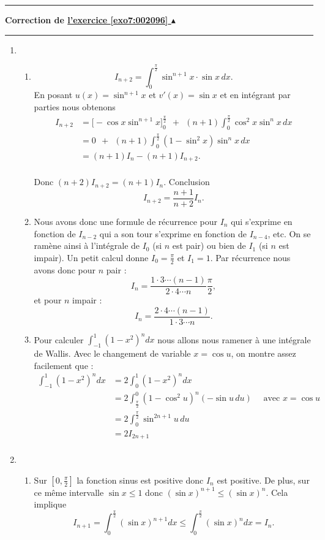 \documentclass[11pt,a4paper]{article}
\renewcommand{\le}{\leqslant} \renewcommand{\leq}{\leqslant}
\newcounter{exo}
\newcommand{\correction}[1]{\hypertarget{cor7:#1}{}\label{cor7:#1}{\bf Correction de \hyperlink{exo7:#1}{l'exercice \ref{exo7:#1} $\blacktriangle$}}\vspace{1mm}\hrule\vspace{1mm}}
\newcommand{\fincorrection}{\vspace{1mm}\hrule\vspace*{7mm}}
\begin{document}
\fincorrection
\correction{002096}
  \begin{enumerate}

  \item 
  \begin{enumerate}
     \item $$ I_{n+2}  = \int_0^{\frac \pi 2} \sin^{n+1} x \cdot \sin x \,  dx.$$
En posant $u(x) = \sin^{n+1} x$ et $v'(x) = \sin x$ et en intégrant par parties nous obtenons
\begin{align*}
I_{n+2} &= \bigg[ -\cos x \sin^{n+1}x \bigg]_0^{\frac \pi 2} \ \  + \ \ (n+1)\int_0^{\frac \pi 2} \cos^2x \sin^nx \, dx \\
 &= 0 \ \  + \ \ (n+1)\int_0^{\frac \pi 2} (1-\sin^2x)\sin^nx \, dx \\
 &= (n+1)I_n-(n+1)I_{n+2}.  \\
\end{align*}

Donc $(n+2)I_{n+2}=(n+1)I_n$.
Conclusion 
$$I_{n+2} = \frac{n+1}{n+2} I_n.$$

     \item Nous avons donc une formule de récurrence pour $I_n$ qui s'exprime en fonction de $I_{n-2}$
qui a son tour s'exprime en fonction de $I_{n-4}$, etc. On se ramène ainsi à l'intégrale de $I_0$ (si $n$ est pair) 
ou bien de $I_1$ (si $n$ est impair). Un petit calcul donne $I_0=\frac \pi 2$ et $I_1=1$.
Par récurrence nous avons donc pour $n$ pair :
$$I_n = \frac{1\cdot3 \cdots (n-1) }{2 \cdot 4 \cdots n} \frac \pi 2,$$
et pour $n$ impair :
$$I_n = \frac{2 \cdot 4 \cdots (n-1)}{1 \cdot 3 \cdots n}.$$

     \item Pour calculer $\int_{-1}^1\left( 1-x^2\right) ^n d x$ nous allons nous ramener à une intégrale de Wallis.
Avec le changement de variable $x=\cos u$, on montre assez facilement que :
\begin{align*}
 \int_{-1}^1\left( 1-x^2\right) ^n d x 
   &=  2\int_0^1\left( 1-x^2\right) ^n d x\\
   &=  2\int_{\frac \pi 2}^{0}  \left( 1-\cos ^2 u\right) ^n (- \sin u \, du)  \quad \text{ avec } x=\cos u \\
   &=  2\int_0^{\frac \pi 2}  \sin^{2n+1} u \, du  \\
   &= 2I_{2n+1}\\
\end{align*}

  \end{enumerate}

  \item
  \begin{enumerate}
     \item Sur $[0,\frac \pi 2]$ la fonction sinus est positive donc $I_n$ est positive.
De plus, sur ce même intervalle $\sin x \leqslant 1$ donc  $(\sin x)^{n+1}  \le (\sin x)^n$.
Cela implique 
$$I_{n+1}=\int_0^{\frac \pi 2}(\sin x)^{n+1} d x \le \int_0^{\frac \pi 2}(\sin x)^n d x = I_n.$$


\end{enumerate}
\end{enumerate}
\end{document}
